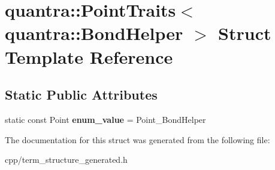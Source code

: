 \hypertarget{structquantra_1_1PointTraits_3_01quantra_1_1BondHelper_01_4}{}\section{quantra\+:\+:Point\+Traits$<$ quantra\+:\+:Bond\+Helper $>$ Struct Template Reference}
\label{structquantra_1_1PointTraits_3_01quantra_1_1BondHelper_01_4}
\subsection*{Static Public Attributes}
\begin{DoxyCompactItemize}
\item 
\mbox{\label{structquantra_1_1PointTraits_3_01quantra_1_1BondHelper_01_4_a8c7337c7d38f6ba0226b677d7244fa70}} 
static const Point {\bfseries enum\+\_\+value} = Point\+\_\+\+Bond\+Helper
\end{DoxyCompactItemize}


The documentation for this struct was generated from the following file\+:\begin{DoxyCompactItemize}
\item 
cpp/term\+\_\+structure\+\_\+generated.\+h\end{DoxyCompactItemize}
